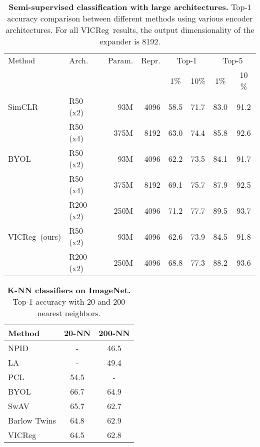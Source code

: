 \documentclass{article}
\newcommand{\algo}{VICReg}
\begin{document}
\begin{table}[t]
\caption{\textbf{Semi-supervised classification with large architectures.} Top-1 accuracy comparison between different methods using various encoder architectures. For all \algo \ results, the output dimensionality of the expander is 8192.}
\label{tab:large_arch_semi}
\vspace{-6mm}
\vskip 0.15in
\begin{center}
\begin{tabular}{llrrcccc}
\toprule
Method  & Arch. & Param.    & Repr. & \multicolumn{2}{c}{Top-1} & \multicolumn{2}{c}{Top-5} \\
        &       &           &       & 1\% & 10\% & 1\% &  10 \% \\
\midrule
SimCLR \cite{chen2020simclr}    & R50 (x2)   &   93M     &   4096    &   58.5    &   71.7  & 83.0  & 91.2  \\
  & R50 (x4)   &   375M    &   8192    &   63.0    &   74.4 &  85.8  & 92.6 \\
\midrule
BYOL \cite{grill2020byol}& R50 (x2)    &   93M     &   4096    &   62.2    &   73.5 & 84.1 & 91.7    \\
 & R50 (x4)    &   375M    &   8192    &   69.1    &   75.7 & 87.9 & 92.5    \\
 & R200 (x2)   &   250M    &   4096    &   71.2    &   77.7 & 89.5 & 93.7    \\
\midrule
\algo \ (ours) & R50 (x2)    &   93M     &   4096    &   62.6    &   73.9  &   84.5    &   91.8  \\
& R200 (x2)   &   250M    &   4096    &   68.8    &   77.3  &   88.2    &   93.6  \\
\bottomrule
\end{tabular}
\end{center}
\end{table}

\begin{table}[t]
\caption{\textbf{K-NN classifiers on ImageNet.} Top-1 accuracy with 20 and 200 nearest neighbors.}
\vspace{-6mm}
\label{tab:results_knn}
\vskip 0.15in
\begin{center}
\begin{tabular}{lcc}
\toprule
Method & 20-NN & 200-NN \\
\midrule
NPID \cite{wu2018discrimination}        &  -        & 46.5    \\
LA \cite{zhuang2019local}               &  -        & 49.4    \\
PCL \cite{li2021pcl}                    &  54.5     & -         \\
BYOL \cite{grill2020byol}               &  66.7     & 64.9  \\
SwAV \cite{caron2020swav}               &  65.7     & 62.7    \\
Barlow Twins \cite{zbontar2021barlow}   &  64.8     & 62.9  \\
\algo \                                 &  64.5     & 62.8  \\
\bottomrule
\end{tabular}
\end{center}
\end{table}
\end{document}
